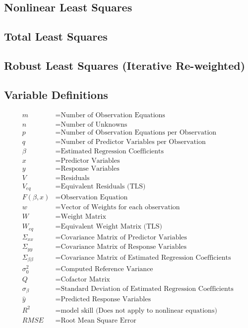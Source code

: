 \documentclass{report}
\begin{document}
\subsection*{Nonlinear Least Squares}

\subsection*{Total Least Squares}

\subsection*{Robust Least Squares (Iterative Re-weighted)}

\clearpage



\subsection*{Variable Definitions}
	\begin{align*}
		m & = \text{Number of Observation Equations} \\
		n & = \text{Number of Unknowns} \\
		p & = \text{Number of Observation Equations per Observation} \\
		q & = \text{Number of Predictor Variables per Observation}\\
		\beta &= \text{Estimated Regression Coefficients} \\
		x &= \text{Predictor Variables} \\
		y &= \text{Response Variables} \\
		V &= \text{Residuals} \\
		V_{eq} &= \text{Equivalent Residuals (TLS)} \\
		F(\beta,x) &= \text{Observation Equation} \\
		w &= \text{Vector of Weights for each observation} \\
		W &= \text{Weight Matrix} \\
		W_{eq} &= \text{Equivalent Weight Matrix (TLS)} \\
		\Sigma_{xx} &= \text{Covariance Matrix of Predictor Variables} \\
		\Sigma_{yy} &= \text{Covariance Matrix of Response Variables} \\
		\Sigma_{\beta \beta} &= \text{Covariance Matrix of Estimated Regression Coefficients} \\
		\sigma_0^2 &= \text{Computed Reference Variance} \\
		Q &= \text{Cofactor Matrix} \\
		\sigma_\beta &= \text{Standard Deviation of Estimated Regression Coefficients } \\
		\hat{y} &= \text{Predicted Response Variables} \\
		R^2 &= \text{model skill (Does not apply to nonlinear equations)} \\
		RMSE &= \text{Root Mean Square Error} \\
	\end{align*}
		
\end{document}
